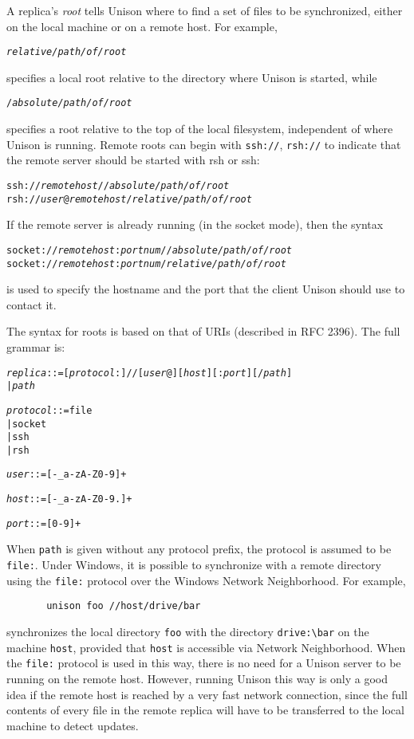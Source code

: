 \documentclass{article}
\newcommand{\NT}[1]{\textit{#1}}
\begin{document}
A replica's {\em root} tells Unison where to find a set of files to be
synchronized, either on the local machine or on a remote host.
For example,
\begin{alltt}
      \NT{relative/path/of/root}
\end{alltt}
\noindent
specifies a local root relative to the directory where Unison is
started, while
\begin{alltt}
      /\NT{absolute/path/of/root}
\end{alltt}
\noindent
specifies a root relative to the top of the local filesystem,
independent of where Unison is running.  Remote roots can begin with
\verb|ssh://|,
\verb|rsh://|
to indicate that the remote server should be started with rsh or ssh:
\begin{alltt}
      ssh://\NT{remotehost}//\NT{absolute/path/of/root}
      rsh://\NT{user}@\NT{remotehost}/\NT{relative/path/of/root}
\end{alltt}
If the remote server is already running (in the socket mode), then the syntax
\begin{alltt}
      socket://\NT{remotehost}:\NT{portnum}//\NT{absolute/path/of/root}
      socket://\NT{remotehost}:\NT{portnum}/\NT{relative/path/of/root}
\end{alltt}
\noindent
is used to specify the hostname and the port that the client Unison should
use to contact it.

The syntax for roots is based on that of URIs (described in RFC 2396).
The full grammar is:
\begin{alltt}
  \NT{replica} ::= [\NT{protocol}:]//[\NT{user}@][\NT{host}][:\NT{port}][/\NT{path}]
           |  \NT{path}

  \NT{protocol} ::= file
            |  socket
            |  ssh
            |  rsh

  \NT{user} ::= [-_a-zA-Z0-9]+

  \NT{host} ::= [-_a-zA-Z0-9.]+

  \NT{port} ::= [0-9]+
\end{alltt}
When \verb|path| is given without any protocol prefix, the protocol is
assumed to be \verb|file:|.  Under Windows, it is possible to
synchronize with a remote directory using the \verb|file:| protocol over
the Windows Network Neighborhood.  For example,
\begin{verbatim}
       unison foo //host/drive/bar
\end{verbatim}
\noindent
synchronizes the local directory \verb|foo| with the directory
\verb|drive:\bar| on the machine \verb|host|, provided that \verb|host|
is accessible via Network Neighborhood.  When the \verb|file:| protocol
is used in this way, there is no need for a Unison server to be running
on the remote host.  However, running Unison this way is only a good
idea if the remote host is reached by a very fast network connection,
since the full contents of every file in the remote replica will have to
be transferred to the local machine to detect updates.
\end{document}
